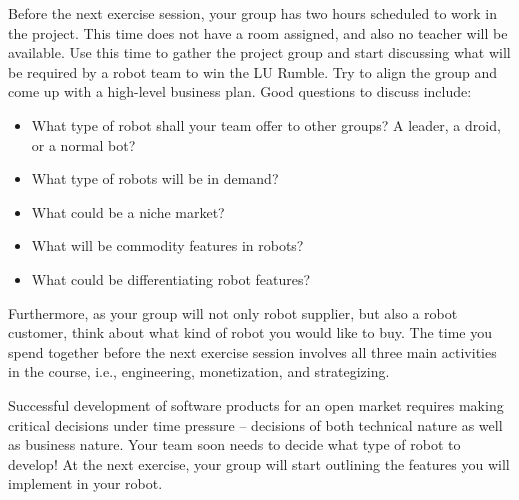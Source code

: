 \documentclass{scrreprt}
\begin{document}
Before the next exercise session, your group has two hours scheduled to work in the project. This time does not have a room assigned, and also no teacher will be available. Use this time to gather the project group and start discussing what will be required by a robot team to win the LU Rumble. Try to align the group and come up with a high-level business plan. Good questions to discuss include:
\begin{itemize}
\item What type of robot shall your team offer to other groups? A leader, a droid, or a normal bot?
\item What type of robots will be in demand?
\item What could be a niche market?
\item What will be commodity features in robots?
\item What could be differentiating robot features?
\end{itemize}

Furthermore, as your group will not only robot supplier, but also a robot customer, think about what kind of robot you would like to buy. The time you spend together before the next exercise session involves all three main activities in the course, i.e., engineering, monetization, and strategizing.  

Successful development of software products for an open market requires making critical decisions under time pressure -- decisions of both technical nature as well as business nature. Your team soon needs to decide what type of robot to develop! At the next exercise, your group will start outlining the features you will implement in your robot.
\end{document}
